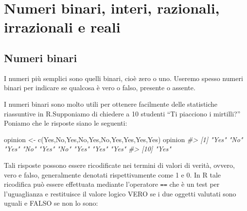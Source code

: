 \documentclass[
]{memoir}
\newenvironment{Shaded}{\begin{snugshade}}{\end{snugshade}}
\newcommand{\CommentTok}[1]{\textcolor[rgb]{0.56,0.35,0.01}{\textit{#1}}}
\newcommand{\FunctionTok}[1]{\textcolor[rgb]{0.00,0.00,0.00}{#1}}
\newcommand{\NormalTok}[1]{#1}
\newcommand{\OtherTok}[1]{\textcolor[rgb]{0.56,0.35,0.01}{#1}}
\newcommand{\StringTok}[1]{\textcolor[rgb]{0.31,0.60,0.02}{#1}}
\theoremstyle{definition}
\theoremstyle{definition}
\theoremstyle{definition}
\theoremstyle{definition}
\theoremstyle{remark}
\begin{document}
\hypertarget{numeri-binari-interi-razionali-irrazionali-e-reali}{%
\chapter{Numeri binari, interi, razionali, irrazionali e reali}\label{numeri-binari-interi-razionali-irrazionali-e-reali}}

\hypertarget{numeri-binari}{%
\section{Numeri binari}\label{numeri-binari}}

I numeri più semplici sono quelli binari, cioè zero o uno. Useremo spesso
numeri binari per indicare se qualcosa è vero o falso, presente o
assente.

I numeri binari sono molto utili per ottenere facilmente delle statistiche riassuntive in R.Supponiamo di chiedere a 10 studenti ``Ti piacciono i mirtilli?'' Poniamo che le risposte siano le seguenti:

\begin{Shaded}
\begin{Highlighting}[]
\NormalTok{opinion }\OtherTok{\textless{}{-}} \FunctionTok{c}\NormalTok{(}\StringTok{\textquotesingle{}Yes\textquotesingle{}}\NormalTok{,}\StringTok{\textquotesingle{}No\textquotesingle{}}\NormalTok{,}\StringTok{\textquotesingle{}Yes\textquotesingle{}}\NormalTok{,}\StringTok{\textquotesingle{}No\textquotesingle{}}\NormalTok{,}\StringTok{\textquotesingle{}Yes\textquotesingle{}}\NormalTok{,}\StringTok{\textquotesingle{}No\textquotesingle{}}\NormalTok{,}\StringTok{\textquotesingle{}Yes\textquotesingle{}}\NormalTok{,}\StringTok{\textquotesingle{}Yes\textquotesingle{}}\NormalTok{,}\StringTok{\textquotesingle{}Yes\textquotesingle{}}\NormalTok{,}\StringTok{\textquotesingle{}Yes\textquotesingle{}}\NormalTok{)}
\NormalTok{opinion}
\CommentTok{\#\textgreater{}  [1] "Yes" "No"  "Yes" "No"  "Yes" "No"  "Yes" "Yes" "Yes"}
\CommentTok{\#\textgreater{} [10] "Yes"}
\end{Highlighting}
\end{Shaded}

Tali risposte possono essere ricodificate nei termini di valori di
verità, ovvero, vero e falso, generalmente denotati rispettivamente come
1 e 0. In R tale ricodifica può essere effettuata mediante l'operatore
\texttt{==} che è un test per l'uguaglianza e restituisce il valore logico VERO
se i due oggetti valutati sono uguali e FALSO se non lo sono:
\end{document}
